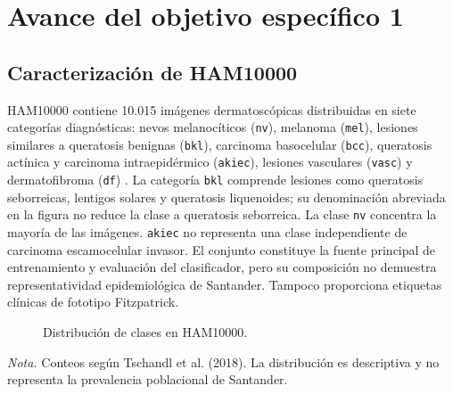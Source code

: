 \chapter{Avance del objetivo específico 1}

\section{Caracterización de HAM10000}

HAM10000 contiene 10.015 imágenes dermatoscópicas distribuidas en siete categorías diagnósticas: nevos melanocíticos (\texttt{nv}), melanoma (\texttt{mel}), lesiones similares a queratosis benignas (\texttt{bkl}), carcinoma basocelular (\texttt{bcc}), queratosis actínica y carcinoma intraepidérmico (\texttt{akiec}), lesiones vasculares (\texttt{vasc}) y dermatofibroma (\texttt{df}) \parencite{tschandl2018ham10000}. La categoría \texttt{bkl} comprende lesiones como queratosis seborreicas, lentigos solares y queratosis liquenoides; su denominación abreviada en la figura no reduce la clase a queratosis seborreica. La clase \texttt{nv} concentra la mayoría de las imágenes. \texttt{akiec} no representa una clase independiente de carcinoma escamocelular invasor. El conjunto constituye la fuente principal de entrenamiento y evaluación del clasificador, pero su composición no demuestra representatividad epidemiológica de Santander. Tampoco proporciona etiquetas clínicas de fototipo Fitzpatrick.

\begin{figure}[htbp]
\centering
{}
\caption{Distribución de clases en HAM10000.}
\label{fig:ham10000-clases}
\end{figure}
\noindent\textit{Nota.} Conteos según Tschandl et al. (2018). La distribución es descriptiva y no representa la prevalencia poblacional de Santander.

